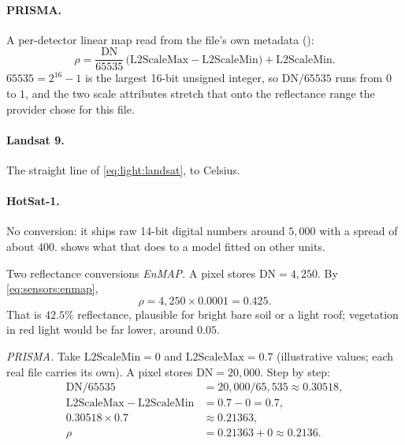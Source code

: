 \paragraph{PRISMA.} A per-detector linear map read from the file's own metadata
():
\begin{equation}\label{eq:sensors:prisma}
\rho = \frac{\mathrm{DN}}{65535}\,\bigl(\mathrm{L2ScaleMax} - \mathrm{L2ScaleMin}\bigr) + \mathrm{L2ScaleMin}.
\end{equation}
$65535 = 2^{16} - 1$ is the largest 16-bit unsigned integer, so $\mathrm{DN}/65535$ runs from $0$
to $1$, and the two scale attributes stretch that onto the reflectance range the provider chose
for this file.

\paragraph{Landsat 9.} The straight line of \cref{eq:light:landsat}, to Celsius.

\paragraph{HotSat-1.} No conversion: it ships raw 14-bit digital numbers around $5{,}000$ with a
spread of about $400$.  shows
what that does to a model fitted on other units.

\begin{worked}[label={we:sensors:dn}]{Two reflectance conversions}
\emph{EnMAP.} A pixel stores $\mathrm{DN} = 4{,}250$. By \cref{eq:sensors:enmap},
\[ \rho = 4{,}250 \times 0.0001 = 0.425. \]
That is $42.5\%$ reflectance, plausible for bright bare soil or a light roof; vegetation in red
light would be far lower, around $0.05$.

\emph{PRISMA.} Take $\mathrm{L2ScaleMin} = 0$ and $\mathrm{L2ScaleMax} = 0.7$ (illustrative
values\tagA; each real file carries its own). A pixel stores $\mathrm{DN} = 20{,}000$. Step by step:
\begin{align*}
\mathrm{DN}/65535 &= 20{,}000/65{,}535 \approx 0.30518,\\
\mathrm{L2ScaleMax} - \mathrm{L2ScaleMin} &= 0.7 - 0 = 0.7,\\
0.30518 \times 0.7 &\approx 0.21363,\\
\rho &= 0.21363 + 0 \approx 0.2136.
\end{align*}
\end{worked}

